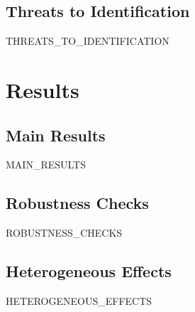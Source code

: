 \subsection{Threats to Identification}
{{THREATS_TO_IDENTIFICATION}}


\section{Results}
\label{sec:results}

\subsection{Main Results}
{{MAIN_RESULTS}}

\subsection{Robustness Checks}
{{ROBUSTNESS_CHECKS}}

\subsection{Heterogeneous Effects}
{{HETEROGENEOUS_EFFECTS}}




